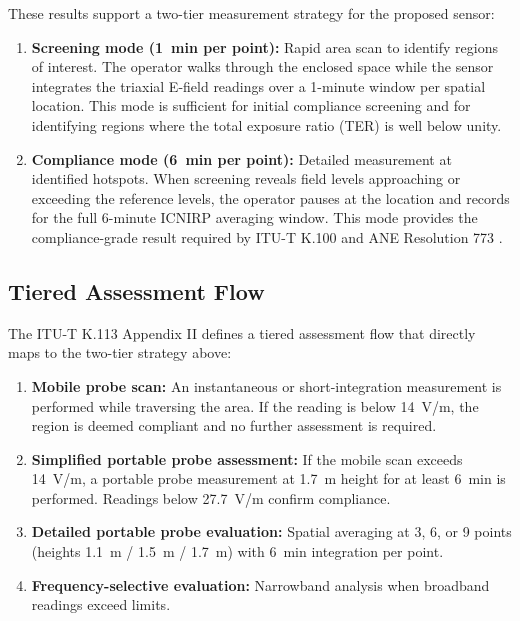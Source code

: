 \documentclass[11pt,a4paper]{article}
\begin{document}
\noindent These results support a two-tier measurement strategy for the proposed sensor:

\begin{enumerate}
    \item \textbf{Screening mode (1~min per point):} Rapid area scan to identify regions of interest. The operator walks through the enclosed space while the sensor integrates the triaxial E-field readings over a 1-minute window per spatial location. This mode is sufficient for initial compliance screening and for identifying regions where the total exposure ratio (TER) is well below unity.
    \item \textbf{Compliance mode (6~min per point):} Detailed measurement at identified hotspots. When screening reveals field levels approaching or exceeding the reference levels, the operator pauses at the location and records for the full 6-minute ICNIRP averaging window. This mode provides the compliance-grade result required by ITU-T K.100 \cite{itut_k100} and ANE Resolution 773 \cite{ane_res773_2023}.
\end{enumerate}

\subsection{Tiered Assessment Flow}

The ITU-T K.113 Appendix II \cite{itut_k113} defines a tiered assessment flow that directly maps to the two-tier strategy above:

\begin{enumerate}
    \item \textbf{Mobile probe scan:} An instantaneous or short-integration measurement is performed while traversing the area. If the reading is below 14~V/m, the region is deemed compliant and no further assessment is required.
    \item \textbf{Simplified portable probe assessment:} If the mobile scan exceeds 14~V/m, a portable probe measurement at 1.7~m height for at least 6~min is performed. Readings below 27.7~V/m confirm compliance.
    \item \textbf{Detailed portable probe evaluation:} Spatial averaging at 3, 6, or 9 points (heights 1.1~m / 1.5~m / 1.7~m) with 6~min integration per point.
    \item \textbf{Frequency-selective evaluation:} Narrowband analysis when broadband readings exceed limits.
\end{enumerate}
\end{document}

